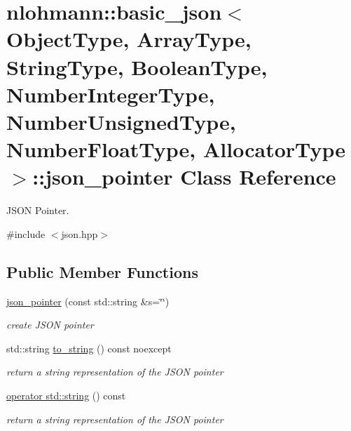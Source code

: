 \hypertarget{classnlohmann_1_1basic__json_1_1json__pointer}{}\section{nlohmann\+:\+:basic\+\_\+json$<$ Object\+Type, Array\+Type, String\+Type, Boolean\+Type, Number\+Integer\+Type, Number\+Unsigned\+Type, Number\+Float\+Type, Allocator\+Type $>$\+:\+:json\+\_\+pointer Class Reference}
\label{classnlohmann_1_1basic__json_1_1json__pointer}


J\+S\+ON Pointer.  




{\ttfamily \#include $<$json.\+hpp$>$}

\subsection*{Public Member Functions}
\begin{DoxyCompactItemize}
\item 
\hyperlink{classnlohmann_1_1basic__json_1_1json__pointer_ae12db117a2742d826465080979d7c835}{json\+\_\+pointer} (const std\+::string \&s=\char`\"{}\char`\"{})
\begin{DoxyCompactList}\small\item\em create J\+S\+ON pointer \end{DoxyCompactList}\item 
std\+::string \hyperlink{classnlohmann_1_1basic__json_1_1json__pointer_a5670f575e57c3b1feb3e934a345d1aaa}{to\+\_\+string} () const noexcept
\begin{DoxyCompactList}\small\item\em return a string representation of the J\+S\+ON pointer \end{DoxyCompactList}\item 
\hyperlink{classnlohmann_1_1basic__json_1_1json__pointer_a319e945a9349ed49fe3a62bc023c8d23}{operator std\+::string} () const
\begin{DoxyCompactList}\small\item\em return a string representation of the J\+S\+ON pointer \end{DoxyCompactList}\end{DoxyCompactItemize}
